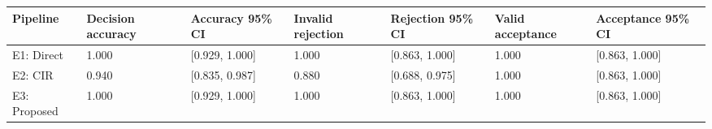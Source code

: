 \begin{tabular}{lllllll}
\toprule
Pipeline & Decision accuracy & Accuracy 95\% CI & Invalid rejection & Rejection 95\% CI & Valid acceptance & Acceptance 95\% CI \\
\midrule
E1: Direct & 1.000 & [0.929, 1.000] & 1.000 & [0.863, 1.000] & 1.000 & [0.863, 1.000] \\
E2: CIR & 0.940 & [0.835, 0.987] & 0.880 & [0.688, 0.975] & 1.000 & [0.863, 1.000] \\
E3: Proposed & 1.000 & [0.929, 1.000] & 1.000 & [0.863, 1.000] & 1.000 & [0.863, 1.000] \\
\bottomrule
\end{tabular}
